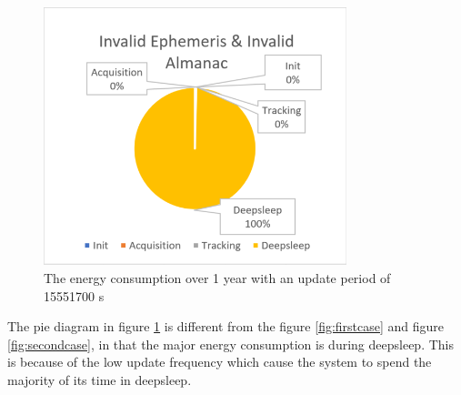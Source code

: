 \begin{figure}[H]
\centering
\includegraphics[height=7.5cm]{Project_Report/Images/invalidinvalid.PNG}
\caption{The energy consumption over 1 year with an update period of 15551700 s}
\label{fig:thirdcase}
\end{figure}

The pie diagram in figure \ref{fig:thirdcase} is different from the figure \ref{fig:firstcase} and figure \ref{fig:secondcase}, in that the major energy consumption is during deepsleep. This is because of the low update frequency which cause the system to spend the majority of its time in deepsleep. 

\newpage